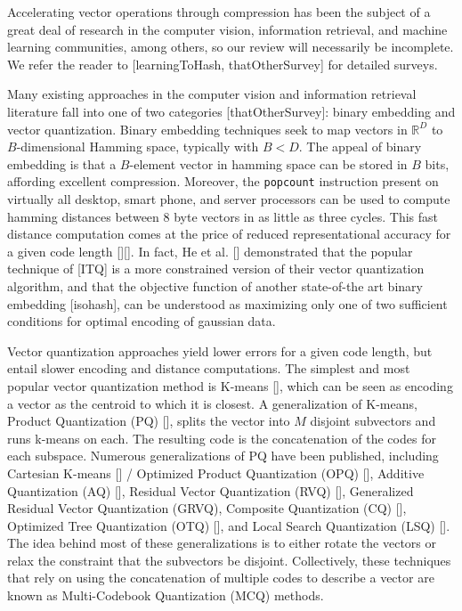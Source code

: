 
Accelerating vector operations through compression has been the subject of a great deal of research in the computer vision, information retrieval, and machine learning communities, among others, so our review will necessarily be incomplete. We refer the reader to [learningToHash, thatOtherSurvey] for detailed surveys. %

Many existing approaches in the computer vision and information retrieval literature fall into one of two categories [thatOtherSurvey]: binary embedding and vector quantization. Binary embedding techniques seek to map vectors in $\mathbb{R}^D$ to $B$-dimensional Hamming space, typically with $B < D$. The appeal of binary embedding is that a $B$-element vector in hamming space can be stored in $B$ bits, affording excellent compression. Moreover, the \texttt{popcount} instruction present on virtually all desktop, smart phone, and server processors can be used to compute hamming distances between 8 byte vectors in as little as three cycles. This fast distance computation comes at the price of reduced representational accuracy for a given code length [][]. In fact, He et al. [] demonstrated that the popular technique of [ITQ] is a more constrained version of their vector quantization algorithm, and that the objective function of another state-of-the art binary embedding [isohash], can be understood as maximizing only one of two sufficient conditions for optimal encoding of gaussian data.

Vector quantization approaches yield lower errors for a given code length, but entail slower encoding and distance computations. The simplest and most popular vector quantization method is K-means [], which can be seen as encoding a vector as the centroid to which it is closest. A generalization of K-means, Product Quantization (PQ) [], splits the vector into $M$ disjoint subvectors and runs k-means on each. The resulting code is the concatenation of the codes for each subspace. Numerous generalizations of PQ have been published, including Cartesian K-means [] / Optimized Product Quantization (OPQ) [], Additive Quantization (AQ) [], Residual Vector Quantization (RVQ) [], Generalized Residual Vector Quantization (GRVQ), Composite Quantization (CQ) [], Optimized Tree Quantization (OTQ) [], and Local Search Quantization (LSQ) []. The idea behind most of these generalizations is to either rotate the vectors or relax the constraint that the subvectors be disjoint. Collectively, these techniques that rely on using the concatenation of multiple codes to describe a vector are known as Multi-Codebook Quantization (MCQ) methods.

